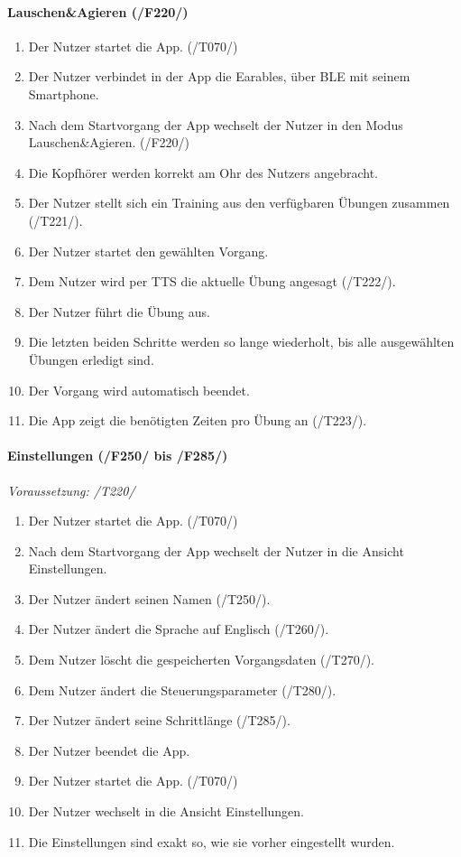 \documentclass[a4paper,12pt]{article}
\begin{document}
      \paragraph{Lauschen\&Agieren (/F220/)}
      \begin{enumerate}
        \item Der Nutzer startet die App. (/T070/)
        \item Der Nutzer verbindet in der App die \gls{Earables}, über \gls{BLE} mit seinem Smartphone.
        \item Nach dem Startvorgang der App wechselt der Nutzer in den Modus \glqq Lauschen\&Agieren\grqq . (/F220/)
        \item Die Kopfhörer werden korrekt am Ohr des Nutzers angebracht.
        \item Der Nutzer stellt sich ein Training aus den verfügbaren Übungen zusammen (/T221/).
        \item Der Nutzer startet den gewählten \Gls{Vorgang}.
        \item Dem Nutzer wird per \Gls{TTS} die aktuelle Übung angesagt (/T222/).
        \item Der Nutzer führt die Übung aus.
        \item Die letzten beiden Schritte werden so lange wiederholt, bis alle ausgewählten Übungen erledigt sind.
        \item Der \Gls{Vorgang} wird automatisch beendet.
        \item Die App zeigt die benötigten Zeiten pro Übung an (/T223/).
      \end{enumerate}

      \paragraph{Einstellungen (/F250/ bis /F285/)}
      \textit{Voraussetzung: /T220/}
      \begin{enumerate}
        \item Der Nutzer startet die App. (/T070/)
        \item Nach dem Startvorgang der App wechselt der Nutzer in die Ansicht \glqq Einstellungen\grqq .
        \item Der Nutzer ändert seinen Namen (/T250/).
        \item Der Nutzer ändert die Sprache auf Englisch (/T260/).
        \item Dem Nutzer löscht die gespeicherten \Gls{Vorgangsdaten} (/T270/).
        \item Dem Nutzer ändert die \Gls{Steuerungsparameter} (/T280/).
        \item Der Nutzer ändert seine Schrittlänge (/T285/).
        \item Der Nutzer beendet die App.
        \item Der Nutzer startet die App. (/T070/)
        \item Der Nutzer wechselt in die Ansicht \glqq Einstellungen\grqq .
        \item Die Einstellungen sind exakt so, wie sie vorher eingestellt wurden.
      \end{enumerate}
\end{document}
